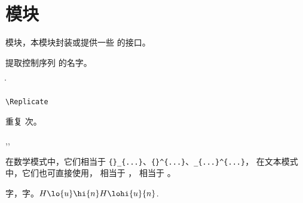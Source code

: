 \documentclass{cusdoc}
\begin{document}
\section{模块}

 模块，本模块封装或提供一些 \LaTeXe 的接口。

\begin{function}[EXP]{\csstring}
  \begin{syntax}
    \V\csstring {}
  \end{syntax}
提取控制序列  的名字。
\end{function}

\begin{xample}
\ttfamily \csstring\CusTeX \quad \csstring\|
\stopxamplecode
\xampleprint
\end{xample}

\begin{function}[EXP]{\Replicate}
\begin{syntax}
  \verb|\Replicate|  
\end{syntax}
重复   次。
\end{function}

\begin{function}{\lo,\hi,\lohi} 
  \begin{syntax}
    \V\lo   {}
    \V\hi   {}
    \V\lohi {} 
  \end{syntax}
在数学模式中，它们相当于 \verb|{}_{...}|、\verb|{}^{...}|、\verb|_{...}^{...}|，
在文本模式中，它们也可直接使用， 相当于 ，
 相当于 。
\end{function}

\begin{xample}
\Large 字，字。$ H\lo{u}\hi{n} H\lohi{u}{n}$.
\stopxamplecode
\xampleprint
\end{xample}
\end{document}
